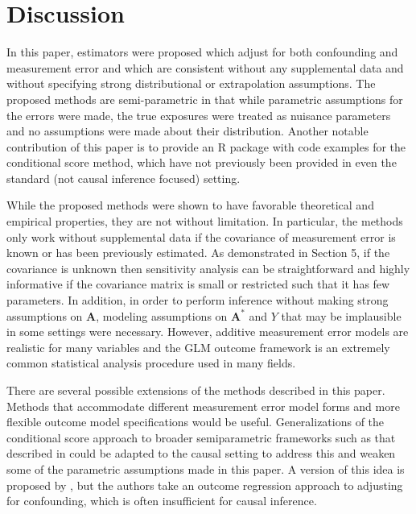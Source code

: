 \documentclass[useAMS,usenatbib,referee]{biom}
\begin{document}
\section{Discussion}

In this paper, estimators were proposed which adjust for both confounding and measurement error and which are consistent without any supplemental data and without specifying strong distributional or extrapolation assumptions. The proposed methods are semi-parametric in that while parametric assumptions for the errors were made, the true exposures were treated as nuisance parameters and no assumptions were made about their distribution. Another notable contribution of this paper is to provide an R package with code examples for the conditional score method, which have not previously been provided in even the standard (not causal inference focused) setting.

While the proposed methods were shown to have favorable theoretical and empirical properties, they are not without limitation. In particular, the methods only work without supplemental data if the covariance of measurement error is known or has been previously estimated. As demonstrated in Section 5, if the covariance is unknown then sensitivity analysis can be straightforward and highly informative if the covariance matrix is small or restricted such that it has few parameters. In addition, in order to perform inference without making strong assumptions on $\bm{A}$, modeling assumptions on $\bm{A}^{*}$ and $Y$ that may be implausible in some settings were necessary. However, additive measurement error models are realistic for many variables and the GLM outcome framework is an extremely common statistical analysis procedure used in many fields.

There are several possible extensions of the methods described in this paper. Methods that accommodate different measurement error model forms and more flexible outcome model specifications would be useful. Generalizations of the conditional score approach to broader semiparametric frameworks such as that described in \citet{tsiatis2004} could be adapted to the causal setting to address this and weaken some of the parametric assumptions made in this paper. A version of this idea is proposed by \citet{liu2017}, but the authors take an outcome regression approach to adjusting for confounding, which is often insufficient for causal inference.
\end{document}
